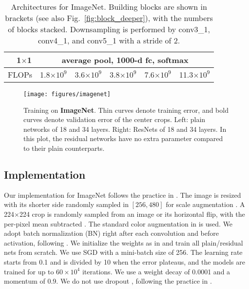 \documentclass{article}
\begin{document}
\begin{table*}[t]
\begin{center}
{\begin{tabular}{c|c|c|c|c|c|c}
\hline
& 1$\times$1  & \multicolumn{5}{c}{average pool, 1000-d fc, softmax} \\
\hline
\multicolumn{2}{c|}{FLOPs} & 1.8$\times10^9$  & 3.6$\times10^9$  & 3.8$\times10^9$  & 7.6$\times10^9$  & 11.3$\times10^9$ \\
\hline
\end{tabular}
}
\end{center}
\vspace{-.5em}
\caption{Architectures for ImageNet. Building blocks are shown in brackets (see also Fig.~\ref{fig:block_deeper}), with the numbers of blocks stacked. Downsampling is performed by conv3\_1, conv4\_1, and conv5\_1 with a stride of 2.
}
\label{tab:arch}
\vspace{-.5em}
\end{table*}

\begin{figure*}[t]
\begin{center}
\texttt{[image: figures/imagenet]}
\end{center}
\vspace{-1.2em}
\caption{Training on \textbf{ImageNet}. Thin curves denote training error, and bold curves denote validation error of the center crops. Left: plain networks of 18 and 34 layers. Right: ResNets of 18 and 34 layers. In this plot, the residual networks have no extra parameter compared to their plain counterparts.}
\label{fig:imagenet}
\end{figure*}

\subsection{Implementation}
\label{sec:impl}

Our implementation for ImageNet follows the practice in \cite{Krizhevsky2012,Simonyan2015}. The image is resized with its shorter side randomly sampled in $[256, 480]$ for scale augmentation \cite{Simonyan2015}. A 224$\times$224 crop is randomly sampled from an image or its horizontal flip, with the per-pixel mean subtracted \cite{Krizhevsky2012}. The standard color augmentation in \cite{Krizhevsky2012} is used.
We adopt batch normalization (BN) \cite{Ioffe2015} right after each convolution and before activation, following \cite{Ioffe2015}.
We initialize the weights as in \cite{He2015} and train all plain/residual nets from scratch.
We use SGD with a mini-batch size of 256. The learning rate starts from 0.1 and is divided by 10 when the error plateaus, and the models are trained for up to $60\times10^4$ iterations. We use a weight decay of 0.0001 and a momentum of 0.9. We do not use dropout \cite{Hinton2012}, following the practice in \cite{Ioffe2015}.
\end{document}
